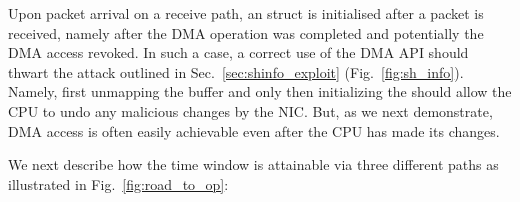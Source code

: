 Upon packet arrival on a receive path, an \shinfo struct is initialised after a packet is received, namely after the DMA operation was completed and potentially the DMA access revoked. In such a case,
a correct use of the DMA API should thwart the attack outlined in Sec.~\ref{sec:shinfo_exploit} (Fig.~\ref{fig:sh_info}). Namely, first unmapping the buffer and only then initializing the \shinfo{} should allow the CPU to undo any malicious changes by the NIC. But, as we next demonstrate, DMA access is often easily achievable even after the CPU has made its changes. 

We next describe how the time window is attainable via three different paths as illustrated in Fig.~\ref{fig:road_to_op}: 


